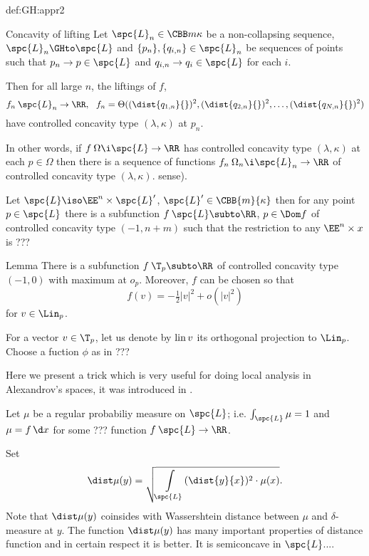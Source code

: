 {\begin{subthm}{def:GH:appr2}
\begin{thm}{Concavity of lifting}
Let $\spc{L}_n\in\CBB m \kappa$ be a non-collapsing sequence,
$\spc{L}_n\GHto \spc{L}$  
and $\{p_n\},\{q_{i,n}\}\in \spc{L}_n$ be sequences of points such that $p_n\to p\in \spc{L}$ and  $q_{i,n}\to q_i\in \spc{L}$
for each $i$.

Then for all large $n$, the liftings of $f$,
$$f_n\:\spc{L}_n\to \RR,\ \
f_n=\Theta((\dist{q_{1,n}}{})^2,(\dist{q_{2,n}}{})^2,\dots,(\dist{q_{N,n}}{})^2)$$
have controlled concavity type $(\lambda,\kappa)$ at $p_n$. 
\end{thm}

In other words, if  $f\:\Omega\i \spc{L}\to \RR$ has controlled concavity type $(\lambda,\kappa)$ at each $p\in \Omega$ then
there is a sequence of functions $f_n\:\Omega_n\i \spc{L}_n\to\RR$ of controlled concavity type $(\lambda,\kappa)$.
sense).

Let $\spc{L}\iso\EE^n\times \spc{L}'$, $\spc{L}'\in\CBB{m}{\kappa}$ then for any point $p\in \spc{L}$ there is a subfunction $f\:\spc{L}\subto\RR$, $p\in\Dom f$ of controlled concavity type $(-1,n+m)$ such that the restriction to any $\EE^n\times x$ is ???



\begin{thm}{Lemma}\label{lem:exist-CCT} 
There is a subfunction $f\:\T_p\subto\RR$ of controlled concavity type $(-1,0)$ with maximum at $o_p$.
Moreover, $f$ can be chosen so that
$$f(v)=-\tfrac12|v|^2+o(|v|^2)$$
for $v\in\Lin_p$.
\end{thm}

\def\lin{\mathop{\rm lin}\nolimits}
For a vector $v\in\T_p$, let us denote by $\lin v$ its orthogonal projection to $\Lin_p$.
Choose a fuction $\phi$ as in ???
\qeds











Here we present a trick which is very useful for doing local analysis in
Alexandrov's spaces, it was introduced in \cite[section 5]{otsu-shioya}.

Let $\mu$ be a regular probabiliy measure on $\spc{L}$;
i.e. $\int_\spc{L}\mu=1$ and $\mu=f\,\d x$ for some ??? function $f\:\spc{L}\to\RR$.

Set 
$$\dist \mu(y)=\sqrt{\int\limits_\spc{L}(\dist{y}{x})^2\cdot\mu(x)}.$$
Note that $\dist \mu(y)$ coinsides with Wassershtein distance between $\mu$ and $\delta$-measure at $y$.
The function $\dist \mu(y)$ has many important properties of distance function and in certain respect it is better.
It is semiconcave in $\spc{L}$....









\end{subthm}}
